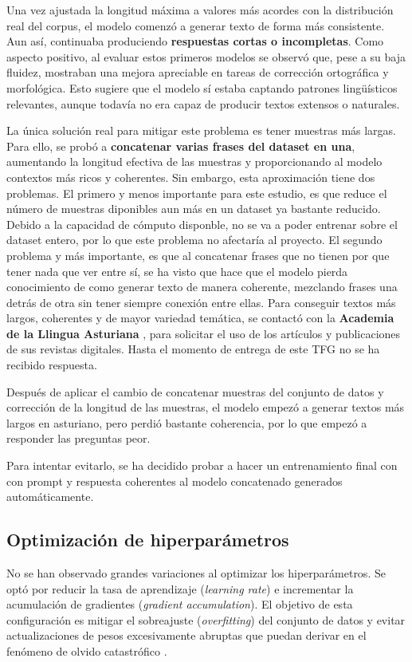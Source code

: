 Una vez ajustada la longitud máxima a valores más acordes con la distribución real del corpus, el modelo comenzó a generar texto de forma más consistente. Aun así, continuaba produciendo \textbf{respuestas cortas o incompletas}. Como aspecto positivo, al evaluar estos primeros modelos se observó que, pese a su baja fluidez, mostraban una mejora apreciable en tareas de corrección ortográfica y morfológica. Esto sugiere que el modelo sí estaba captando patrones lingüísticos relevantes, aunque todavía no era capaz de producir textos extensos o naturales.

La única solución real para mitigar este problema es tener muestras más largas. Para ello, se probó a \textbf{concatenar varias frases del dataset en una}, aumentando la longitud efectiva de las muestras y proporcionando al modelo contextos más ricos y coherentes. Sin embargo, esta aproximación tiene dos problemas. El primero y menos importante para este estudio, es que reduce el número de muestras diponibles aun más en un dataset ya bastante reducido. Debido a la capacidad de cómputo disponble, no se va a poder entrenar sobre el dataset entero, por lo que este problema no afectaría al proyecto. El segundo problema y más importante, es que al concatenar frases que no tienen por que tener nada que ver entre sí, se ha visto que hace que el modelo pierda conocimiento de como generar texto de manera coherente, mezclando frases una detrás de otra sin tener siempre conexión entre ellas. Para conseguir textos más largos, coherentes y de mayor variedad temática, se contactó con la \textbf{Academia de la Llingua Asturiana} \cite{ALLA2024}, para solicitar el uso de los artículos y publicaciones de sus revistas digitales. Hasta el momento de entrega de este TFG no se ha recibido respuesta.

 Después de aplicar el cambio de concatenar muestras del conjunto de datos y corrección de la longitud de las muestras, el modelo empezó a generar textos más largos en asturiano, pero perdió bastante coherencia, por lo que empezó a responder las preguntas peor. 
 
 Para intentar evitarlo, se ha decidido probar a hacer un entrenamiento final con  con prompt y respuesta coherentes al modelo concatenado generados automáticamente.
 
\subsection{Optimización de hiperparámetros}
 No se han observado grandes variaciones al optimizar los hiperparámetros. Se optó por reducir la tasa de aprendizaje (\textit{learning rate}) e incrementar la acumulación de gradientes (\textit{gradient accumulation}). El objetivo de esta configuración es mitigar el sobreajuste (\textit{overfitting}) del conjunto de datos y evitar actualizaciones de pesos excesivamente abruptas que puedan derivar en el fenómeno de olvido catastrófico \cite{luo2023an}. 
 
